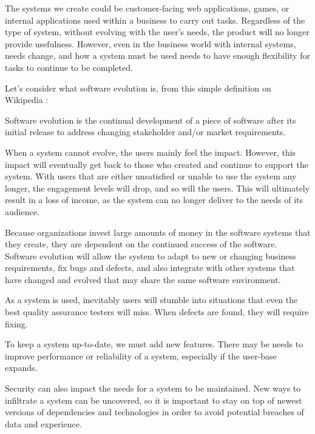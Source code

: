 \documentclass[12pt,conference]{IEEEtran}
\begin{document}
The systems we create could be customer-facing web applications, games, or internal applications used within a business to carry out tasks. Regardless of the type of system, without evolving with the user's needs, the product will no longer provide usefulness. However, even in the business world with internal systems, needs change, and how a system must be used needs to have enough flexibility for tasks to continue to be completed.

Let's consider what software evolution is, from this simple definition on Wikipedia \cite{wiki:software-evolution}:

\begin{displayquote}
Software evolution is the continual development of a piece of software after its initial release to address changing stakeholder and/or market requirements.
\end{displayquote}


When a system cannot evolve, the users mainly feel the impact. However, this impact will eventually get back to those who created and continue to support the system. With users that are either unsatisfied or unable to use the system any longer, the engagement levels will drop, and so will the users. This will ultimately result in a loss of income, as the system can no longer deliver to the needs of its audience.

Because organizations invest large amounts of money in the software systems that they create, they are dependent on the continued success of the software. Software evolution will allow the system to adapt to new or changing business requirements, fix bugs and defects, and also integrate with other systems that have changed and evolved that may share the same software environment.

As a system is used, inevitably users will stumble into situations that even the best quality assurance testers will miss. When defects are found, they will require fixing. 

To keep a system up-to-date, we must add new features. There may be needs to improve performance or reliability of a system, especially if the user-base expands.

Security can also impact the needs for a system to be maintained. New ways to infiltrate a system can be uncovered, so it is important to stay on top of newest versions of dependencies and technologies in order to avoid potential breaches of data and experience.
\end{document}
